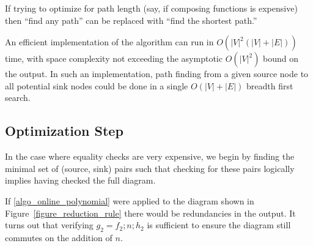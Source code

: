 \documentclass[sigplan,review,nonacm=true]{acmart}
\begin{document}
If trying to optimize for path length (say, if composing functions is expensive) then ``find any path'' can be replaced with ``find the shortest path.''

An efficient implementation of the algorithm can run in $O(|V|^2(|V|+|E|))$ time, with space complexity not exceeding the asymptotic $O(|V|^2)$ bound on the output.
In such an implementation, path finding from a given source node to all potential sink nodes could be done in a single $O(|V|+|E|)$ breadth first search.

\subsection{Optimization Step}

In the case where equality checks are very expensive, we begin by finding the minimal set of (source, sink) pairs such that checking for these pairs logically implies having checked the full diagram.

If \ref{algo_online_polynomial} were applied to the diagram shown in Figure~\ref{figure_reduction_rule} there would be redundancies in the output.
It turns out that verifying $g_2=f_2 ; n ; h_2$ is sufficient to ensure the diagram still commutes on the addition of $n$.
\end{document}
